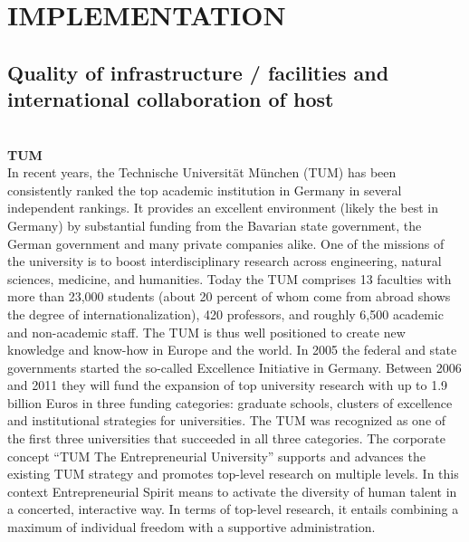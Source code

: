 \section{IMPLEMENTATION} %
\label{sec:implementation}
\subsection{Quality of infrastructure / facilities and international collaboration of host} 
\\
\textbf{TUM}\\
In  recent years, the  Technische Universit\"at  M\"unchen (TUM)  has been
consistently ranked the top academic institution in Germany in several
independent rankings. It provides an excellent environment (likely the
best  in  Germany) by  substantial  funding  from  the Bavarian  state
government,   the  German  government   and  many   private  companies
alike.  One   of  the   missions  of  the   university  is   to  boost
interdisciplinary  research   across  engineering,  natural  sciences,
medicine, and  humanities. Today the  TUM comprises 13  faculties with
more than 23,000  students (about 20 percent of  whom come from abroad
shows the degree of internationalization), 420 professors, and roughly
6,500 academic  and non-academic staff. The TUM is thus well
positioned  to create  new knowledge  and know-how  in Europe  and the
world.  In  2005  the  federal  and  state  governments  started  the
so-called Excellence Initiative in Germany. Between 2006 and 2011 they
will  fund the expansion  of top  university research  with up  to 1.9
billion Euros in three  funding categories: graduate schools, clusters
of excellence  and institutional strategies for  universities. The TUM
was recognized as  one of the first three  universities that succeeded
in   all   three  categories.    The   corporate   concept  ``TUM   The
Entrepreneurial  University'' supports  and advances  the  existing TUM
strategy and  promotes top-level research on multiple  levels. In this
context Entrepreneurial  Spirit means  to activate the  diversity of
human talent  in a concerted,  interactive way. In terms  of top-level
research, it entails combining a  maximum of individual freedom with a
supportive administration.

